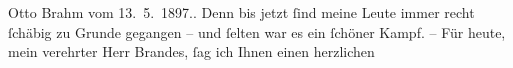 \begin{ledgroupsized}[t]{13cm}
{{{                     Otto Brahm vom
                  13. 5. 1897.}}}\label{K_L00643_1h}. Denn bis jetzt ſind meine Leute immer recht
               ſchäbig zu Grunde gegangen – und ſelten war es ein ſchöner Kampf.\pend
           \pstart – Für heute, mein verehrter Herr Brandes, ſag ich Ihnen einen herzlichen \label{T_L00643_2v}\label{T_L00643_2h}\pend{}\endnumbering{}\end{ledgroupsized}  \newcommand{\dateiname}{L00643}\newcommand{\titel}{Arthur Schnitzler an Georg Brandes, 3. 2. 1897}\newcommand{\editorInnen}{Martin Anton Müller und Gerd-Hermann Susen}
            \footnotesize
\begin{ledgroupsized}[t]{11.5cm}
\end{ledgroupsized}
         
      